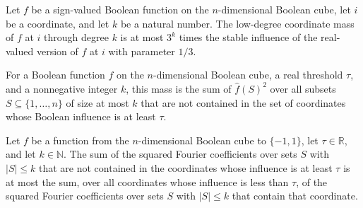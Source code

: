 \begin{theorem}
\label{FABL.lowDegreeCoordinateMass_le_three_pow_mul_stableInfluence}
\leanok
{}
Let $f$ be a sign-valued Boolean function on the $n$-dimensional Boolean cube, let $i$
be a coordinate, and let $k$ be a natural number. The low-degree coordinate mass of $f$
at $i$ through degree $k$ is at most $3^k$ times the stable influence of the real-valued
version of $f$ at $i$ with parameter $1/3$.
\end{theorem}

\begin{definition}
\label{FABL.lowDegreeOutsideInfluentialMass}
\leanok
{}
For a Boolean function $f$ on the $n$-dimensional Boolean cube, a real threshold $\tau$,
and a nonnegative integer $k$, this mass is the sum of $\widehat f(S)^2$ over all
subsets $S\subseteq\{1,\ldots,n\}$ of size at most $k$ that are not contained in the set
of coordinates whose Boolean influence is at least $\tau$.
\end{definition}

\begin{theorem}
\label{FABL.lowDegreeOutsideInfluentialMass_le_sum_coordinateMass}
\leanok
{}
Let $f$ be a function from the $n$-dimensional Boolean cube to $\{-1,1\}$, let
$\tau\in\mathbb R$, and let $k\in\mathbb N$. The sum of the squared Fourier coefficients
over sets $S$ with $|S|\le k$ that are not contained in the coordinates whose influence
is at least $\tau$ is at most the sum, over all coordinates whose influence is less than
$\tau$, of the squared Fourier coefficients over sets $S$ with $|S|\le k$ that contain
that coordinate.
\end{theorem}

